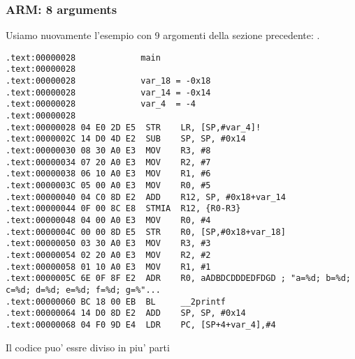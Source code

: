 \subsubsection{ARM: 8 arguments}

Usiamo nuovamente l'esempio con 9 argomenti della sezione precedente: .



\myparagraph{\OptimizingKeilVI: \ARMMode}

\begin{lstlisting}[style=customasmARM]
.text:00000028             main
.text:00000028
.text:00000028             var_18 = -0x18
.text:00000028             var_14 = -0x14
.text:00000028             var_4  = -4
.text:00000028
.text:00000028 04 E0 2D E5  STR    LR, [SP,#var_4]!
.text:0000002C 14 D0 4D E2  SUB    SP, SP, #0x14
.text:00000030 08 30 A0 E3  MOV    R3, #8
.text:00000034 07 20 A0 E3  MOV    R2, #7
.text:00000038 06 10 A0 E3  MOV    R1, #6
.text:0000003C 05 00 A0 E3  MOV    R0, #5
.text:00000040 04 C0 8D E2  ADD    R12, SP, #0x18+var_14
.text:00000044 0F 00 8C E8  STMIA  R12, {R0-R3}
.text:00000048 04 00 A0 E3  MOV    R0, #4
.text:0000004C 00 00 8D E5  STR    R0, [SP,#0x18+var_18]
.text:00000050 03 30 A0 E3  MOV    R3, #3
.text:00000054 02 20 A0 E3  MOV    R2, #2
.text:00000058 01 10 A0 E3  MOV    R1, #1
.text:0000005C 6E 0F 8F E2  ADR    R0, aADBDCDDDEDFDGD ; "a=%d; b=%d; c=%d; d=%d; e=%d; f=%d; g=%"...
.text:00000060 BC 18 00 EB  BL     __2printf
.text:00000064 14 D0 8D E2  ADD    SP, SP, #0x14
.text:00000068 04 F0 9D E4  LDR    PC, [SP+4+var_4],#4
\end{lstlisting}

Il codice puo' essre diviso in piu' parti

